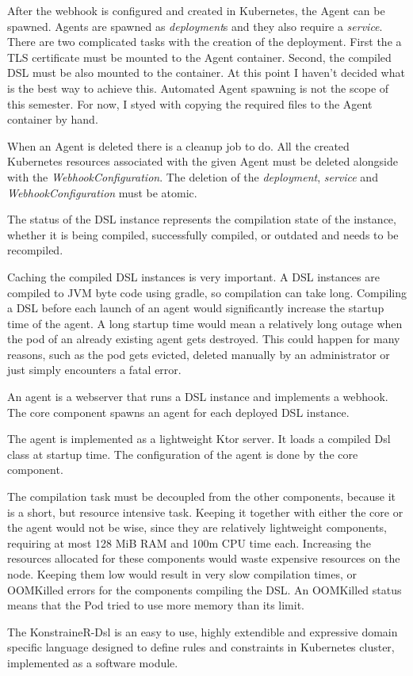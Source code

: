 After the webhook is configured and created in Kubernetes, the Agent can be spawned. Agents are spawned as \emph{deployment}s and they also require a \emph{service}. There are two complicated tasks with the creation of the deployment. First the a TLS certificate must be mounted to the Agent container. Second, the compiled DSL must be also mounted to the container. At this point I haven't decided what is the best way to achieve this. Automated Agent spawning is not the scope of this semester. For now, I styed with copying the required files to the Agent container by hand.

When an Agent is deleted there is a cleanup job to do. All the created Kubernetes resources associated with the given Agent must be deleted alongside with the \emph{WebhookConfiguration}. The deletion of the \emph{deployment}, \emph{service} and \emph{WebhookConfiguration} must be atomic.

The status of the DSL instance represents the compilation state of the instance, whether it is being compiled, successfully compiled, or outdated and needs to be recompiled.

Caching the compiled DSL instances is very important. A DSL instances are compiled to JVM byte code using gradle, so compilation can take long. Compiling a DSL before each launch of an agent would significantly increase the startup time of the agent. A long startup time would mean a relatively long outage when the pod of an already existing agent gets destroyed. This could happen for many reasons, such as the pod gets evicted, deleted manually by an administrator or just simply encounters a fatal error.

An agent is a webserver that runs a DSL instance and implements a webhook. The core component spawns an agent for each deployed DSL instance.

The agent is implemented as a lightweight Ktor server. It loads a compiled Dsl class at startup time. The configuration of the agent is done by the core component.

The compilation task must be decoupled from the other components, because it is a short, but resource intensive task. Keeping it together with either the core or the agent would not be wise, since they are relatively lightweight components, requiring at most 128 MiB RAM and 100m CPU time each. Increasing the resources allocated for these components would waste expensive resources on the node. Keeping them low would result in very slow compilation times, or OOMKilled errors for the components compiling the DSL. An OOMKilled status means that the Pod tried to use more memory than its limit.


The KonstraineR-Dsl is an easy to use, highly extendible and expressive domain specific language designed to define rules and constraints in Kubernetes cluster, implemented as a software module.